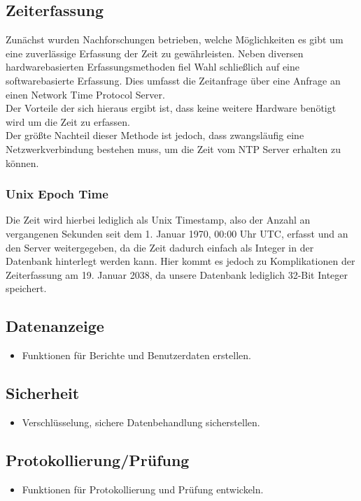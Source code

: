 \documentclass[../main.tex]{subfiles}
\begin{document}
\subsection{Zeiterfassung} \label{ZeitwerfassungEntwicklung}
Zunächst wurden Nachforschungen betrieben, welche Möglichkeiten es gibt um eine zuverlässige Erfassung der Zeit zu gewährleisten. Neben diversen hardwarebasierten Erfassungsmethoden fiel Wahl schließlich auf eine softwarebasierte Erfassung. Dies umfasst die Zeitanfrage über eine Anfrage an einen Network Time Protocol Server.\\
Der Vorteile der sich hieraus ergibt ist, dass keine weitere Hardware benötigt wird um die Zeit zu erfassen.\\ 
Der größte Nachteil dieser Methode ist jedoch, dass zwangsläufig eine Netzwerkverbindung bestehen muss, um die Zeit vom NTP Server erhalten zu können.
\subsubsection{Unix Epoch Time} 
Die Zeit wird hierbei lediglich als Unix Timestamp, also der Anzahl an vergangenen Sekunden seit dem 1. Januar 1970, 00:00 Uhr UTC, erfasst und an den Server weitergegeben, da die Zeit dadurch einfach als Integer in der Datenbank hinterlegt werden kann. Hier kommt es jedoch zu Komplikationen der Zeiterfassung am 19. Januar 2038, da unsere Datenbank lediglich 32-Bit Integer speichert.


\subsection{Datenanzeige}
\begin{itemize}
  \item Funktionen für Berichte und Benutzerdaten erstellen.
\end{itemize}

\subsection{Sicherheit}
\begin{itemize}
  \item Verschlüsselung, sichere Datenbehandlung sicherstellen.
\end{itemize}

\subsection{Protokollierung/Prüfung}
\begin{itemize}
  \item Funktionen für Protokollierung und Prüfung entwickeln.
\end{itemize}
\end{document}
